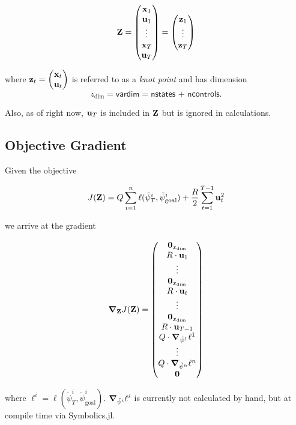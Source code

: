 \documentclass{article}
\newcommand{\isopsi}{\tilde \psi}
\begin{document}
\begin{equation}
  \vb{Z} = \mqty(
    \vb{x}_1 \\
    \vb{u}_1 \\
    \vdots \\
    \vb{x}_T \\
    \vb{u}_T \\
  ) =
  \mqty(
    \vb{z}_1 \\
    \vdots \\ 
    \vb{z}_T
  )
\end{equation}

where $\vb{z}_t = \mqty( \vb{x}_t \\ \vb{u}_t)$ is referred to as a \textit{knot point} and has dimension 
$$
z_{\dim} = \textsf{vardim} = \textsf{nstates + ncontrols}.
$$ 

Also, as of right now, $\vb{u}_T$ is included in $\vb{Z}$ but is ignored in calculations. 

\subsection{Objective Gradient}

Given the objective

\begin{equation}
  J(\vb{Z}) = Q \sum_{i=1}^n \ell(\isopsi_T^i, \isopsi_\text{goal}^i) + \frac{R}{2} \sum_{t=1}^{T-1} \vb{u}_t^2 
\end{equation}

we arrive at the gradient

\begin{equation}
  \grad_{\vb{Z}} J(\vb{Z}) = \mqty(
    \vb{0}_{x_{\dim}} \\
    R \cdot \vb{u}_1 \\
    \vdots \\
    \vb{0}_{x_{\dim}} \\
    R \cdot \vb{u}_t \\
    \vdots \\
    \vb{0}_{x_{\dim}} \\
    R \cdot \vb{u}_{T-1} \\
    Q \cdot \grad_{\isopsi^1} \ell^1 \\
    \vdots \\
    Q \cdot \grad_{\isopsi^n} \ell^n \\
    \vb{0}
  ) 
\end{equation}

where $\ell^i = \ell(\isopsi^i_T, \isopsi^i_{\text{goal}})$. $\grad_{\isopsi^i}\ell^i$ is currently not calculated by hand, but at compile time via \textsf{Symbolics.jl}.
\end{document}
